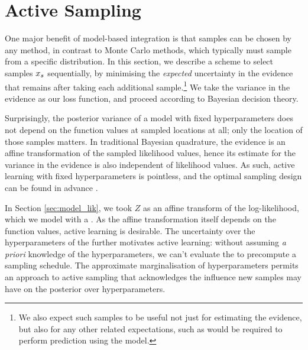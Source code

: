 \documentclass{article} %
\begin{document}
\section{Active Sampling}\label{sec:BBQ}

One major benefit of model-based integration is that samples can be chosen by any method, in contrast to Monte Carlo methods, which typically must sample from a specific distribution.  In this section, we describe a scheme to select samples $\lfv_s$ sequentially, by minimising the \textit{expected} uncertainty in the evidence that remains after taking each additional sample.\footnote{We also expect such samples to be useful not just for estimating the evidence, but also for any other related expectations, such as would be required to perform prediction using the model.} We take the variance in the evidence as our loss function, and proceed according to Bayesian decision theory.

Surprisingly, the posterior variance of a \gpb model with fixed hyperparameters does not depend on the function values at sampled locations at all; only the location of those samples matters. In traditional Bayesian quadrature, the evidence is an affine transformation of the sampled likelihood values, hence its estimate for the variance in the evidence is also independent of likelihood values. As such, active learning with fixed hyperparameters is pointless, and the optimal sampling design can be found in advance \cite{minka2000dqr}.

In Section \ref{sec:model_lik}, we took $Z$ as an affine transform of the log-likelihood, which we model with a \gp. As the affine transformation itself depends on the function values, active learning is  desirable. The uncertainty over the hyperparameters of the \gpb further motivates active learning: without assuming \textit{a priori} knowledge of the hyperparameters, we can't evaluate the \gpb to precompute a sampling schedule. The approximate marginalisation of hyperparameters permits an approach to active sampling that acknowledges the influence new samples may have on the posterior over hyperparameters. 
 
% 
\end{document}
